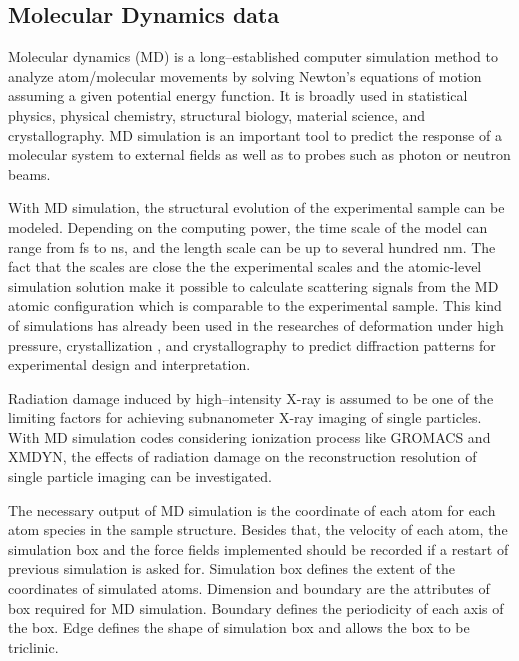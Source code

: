 \documentclass[11pt, a4paper]{article}
\begin{document}
\subsection{Molecular Dynamics data}
Molecular dynamics (MD) is a long--established computer simulation method to analyze atom/molecular movements by solving Newton's
equations of motion assuming a given potential energy function. It is broadly used in statistical physics, physical chemistry,
structural biology, material science, and crystallography. MD simulation is an important tool to predict the response of a 
molecular system to external fields as well as to probes such as photon or neutron beams.

With MD simulation, the structural evolution of the experimental sample can be modeled. Depending on the computing power, the time scale 
of the model can range from fs to ns, and the length scale can be up to several hundred nm. The fact that the scales are 
close the the experimental scales and the atomic-level simulation solution make it possible to calculate 
scattering signals from the MD atomic configuration which is comparable to the experimental sample. This kind of simulations has already
been used in the researches of deformation under high pressure\cite{kimminau2008jpcm,tang2017jap,tang2018jsr,zhang2019jsr}, 
crystallization \cite{e2015}, and crystallography \cite{coleman2013msmse} to predict diffraction patterns for experimental design
and interpretation.

Radiation damage induced by high--intensity X-ray is assumed to be one of the limiting factors
for achieving subnanometer X-ray imaging of single particles\cite{caleman2011acsn}. With MD simulation codes considering ionization
process like GROMACS\cite{lindahl2001} and XMDYN\cite{jurek2016}, the effects of radiation damage on the reconstruction resolution
of single particle imaging can be investigated.

The necessary output of MD simulation is the coordinate of each atom for each atom species in the sample structure. Besides that, the velocity of each atom, 
the simulation box and the force fields implemented should be recorded if a restart of previous simulation is asked for. Simulation box defines the extent of
the coordinates of simulated atoms. Dimension and boundary are the attributes of box required for MD simulation. Boundary defines the periodicity of each axis of the box.
Edge defines the shape of simulation box and allows the box to be triclinic. 
\end{document}
